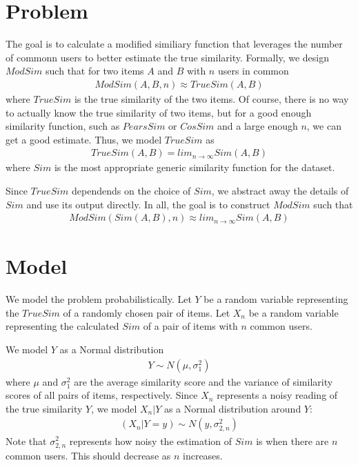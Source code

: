 \documentclass[10pt]{article}
\begin{document}
\section*{Problem}
The goal is to calculate a modified similiary function that leverages the number of
commonn users to better estimate the true similarity. Formally, we design
$ModSim$ such that for two items $A$ and $B$ with $n$ users in common
\begin{align}
ModSim(A, B, n) \approx TrueSim(A, B)
\end{align}
where $TrueSim$ is the true similarity of the two items. Of course, there is no
way to actually know the true similarity of two items, but for a good enough
similarity function, such as $PearsSim$ or $CosSim$ and a large enough $n$, we
can get a good estimate. Thus, we model $TrueSim$ as 
\begin{align}
TrueSim(A, B) = lim_{n\to\infty}Sim(A, B)
\end{align}
where $Sim$ is the most appropriate generic similarity function for the dataset.

Since $TrueSim$ dependends on the choice of $Sim$, we abstract away the details
of $Sim$ and use its output directly. In all, the goal is to construct $ModSim$ such that
\begin{align}
ModSim(Sim(A, B), n) \approx lim_{n\to\infty}Sim(A, B)
\end{align}

\section*{Model}
We model the problem probabilistically. Let $Y$ be a random variable
representing the $TrueSim$ of a randomly chosen pair of items. Let $X_n$ be a
random variable representing the calculated $Sim$ of a pair of items with $n$ common users.

We model $Y$ as a Normal distribution 
\begin{align}
Y \sim N(\mu, \sigma_{1}^2)
\end{align}
where $\mu$ and $\sigma_{1}^2$ are the average similarity score and the variance of similarity scores
of all pairs of items, respectively. Since $X_n$ represents a noisy reading of
the true similarity $Y$, we model $X_n | Y$ as a Normal distribution around $Y$:
\begin{align}
(X_n | Y=y) \sim N(y, \sigma_{2, n}^2)
\end{align}
Note that $\sigma_{2, n}^2$ represents how noisy the estimation of $Sim$ is
when there are $n$ common users. This should decrease as $n$ increases.
\end{document}
